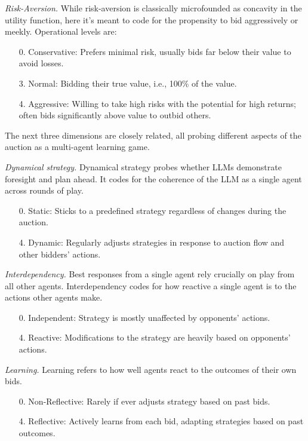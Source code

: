 \documentclass{article} %
\begin{document}
\textit{Risk-Aversion.} While risk-aversion is classically microfounded as concavity in the utility function, here it's meant to code for the propensity to bid aggressively or meekly. Operational levels are: 
\begin{enumerate}
    \item[0.] Conservative: Prefers minimal risk, usually bids far below their value to avoid losses.
    \item[3. ] Normal: Bidding their true value, i.e., 100\% of the value. 
    \item[4. ] Aggressive: Willing to take high risks with the potential for high returns; often bids significantly above value to outbid others.   
\end{enumerate}

The next three dimensions are closely related, all probing different aspects of the auction as a multi-agent learning game. 

\textit{Dynamical strategy.}
Dynamical strategy probes whether LLMs demonstrate foresight and plan ahead. It codes for the coherence of the LLM as a single agent across rounds of play. 
\begin{enumerate}
    \item[0.] Static: Sticks to a predefined strategy regardless of changes during the auction.
    \item[4.] Dynamic: Regularly adjusts strategies in response to auction flow and other bidders’ actions.
\end{enumerate}

\textit{Interdependency.}
Best responses from a single agent rely crucially on play from all other agents. Interdependency codes for how reactive a single agent is to the actions other agents make.

\begin{enumerate}
    \item[0.] Independent: Strategy is mostly unaffected by opponents' actions. 
    \item[4.] Reactive: Modifications to the strategy are heavily based on opponents' actions. 
\end{enumerate}

\textit{Learning.}
Learning refers to how well agents react to the outcomes of their own bids.

\begin{enumerate}
    \item[0.] Non-Reflective: Rarely if ever adjusts strategy based on past bids.
    \item[4.] Reflective: Actively learns from each bid, adapting strategies based on past outcomes.
\end{enumerate}
\end{document}
